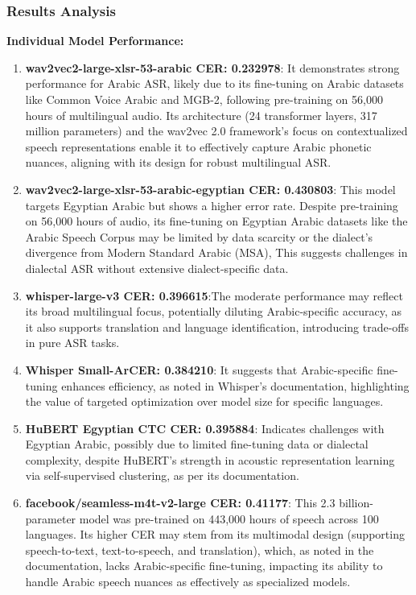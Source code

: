 \documentclass[12pt]{article}
\begin{document}
\subsubsection{Results Analysis}

\textbf{Individual Model Performance:}

\begin{enumerate}
    \item \textbf{wav2vec2-large-xlsr-53-arabic CER: 0.232978}: It demonstrates strong performance for Arabic ASR, likely due to its fine-tuning on Arabic datasets like Common Voice Arabic and MGB-2, following pre-training on 56,000 hours of multilingual audio. Its architecture (24 transformer layers, 317 million parameters) and the wav2vec 2.0 framework’s focus on contextualized speech representations enable it to effectively capture Arabic phonetic nuances, aligning with its design for robust multilingual ASR.
    
    \item \textbf{wav2vec2-large-xlsr-53-arabic-egyptian CER: 0.430803}: This model targets Egyptian Arabic but shows a higher error rate. Despite pre-training on 56,000 hours of audio, its fine-tuning on Egyptian Arabic datasets like the Arabic Speech Corpus may be limited by data scarcity or the dialect’s divergence from Modern Standard Arabic (MSA), This suggests challenges in dialectal ASR without extensive dialect-specific data.
    
    \item \textbf{whisper-large-v3 CER: 0.396615}:The moderate performance may reflect its broad multilingual focus, potentially diluting Arabic-specific accuracy, as it also supports translation and language identification, introducing trade-offs in pure ASR tasks.
    
    \item \textbf{Whisper Small-ArCER: 0.384210}: It suggests that Arabic-specific fine-tuning enhances efficiency, as noted in Whisper’s documentation, highlighting the value of targeted optimization over model size for specific languages.
    
    \item \textbf{HuBERT Egyptian CTC CER: 0.395884}: Indicates challenges with Egyptian Arabic, possibly due to limited fine-tuning data or dialectal complexity, despite HuBERT’s strength in acoustic representation learning via self-supervised clustering, as per its documentation.
    
    \item \textbf{facebook/seamless-m4t-v2-large CER: 0.41177}: This 2.3 billion-parameter model was pre-trained on 443,000 hours of speech across 100 languages. Its higher CER may stem from its multimodal design (supporting speech-to-text, text-to-speech, and translation), which, as noted in the documentation, lacks Arabic-specific fine-tuning, impacting its ability to handle Arabic speech nuances as effectively as specialized models.
\end{enumerate}
\end{document}
